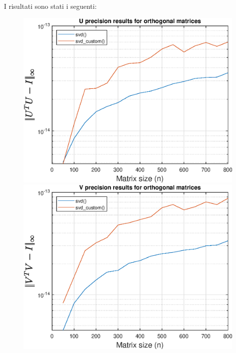 I risultati sono stati i seguenti:

\begin{figure}[!htb]
\includegraphics[width=\linewidth]{imgs/01_-_U_precision_results_for_orthogonal_matrices.eps}
\endminipage\hfill
{}  
\includegraphics[width=\linewidth]{imgs/02_-_V_precision_results_for_orthogonal_matrices.eps}
\endminipage\hfill
{}  

\end{figure}
